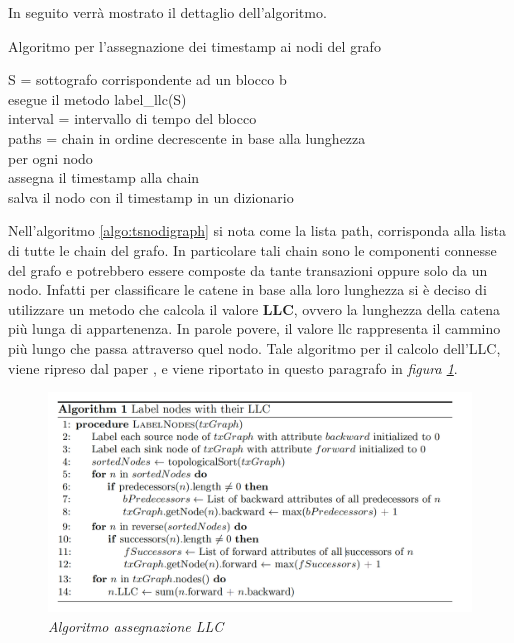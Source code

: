In seguito verrà mostrato il dettaglio dell'algoritmo.
\\
\begin{algorithm}[h]
	\caption{Algoritmo per l'assegnazione dei timestamp ai nodi del grafo} \label{algo:tsnodigraph}
	\begin{algorithmic}

		S = sottografo corrispondente ad un blocco b\\
		esegue il metodo label_llc(S)\\
		interval = intervallo di tempo del blocco	\\
		paths = chain in ordine decrescente in base alla lunghezza\\
			per ogni nodo\\
				assegna il timestamp alla chain\\
					salva il nodo con il timestamp in un dizionario
				\EndFor
			
			\EndIf
		\EndFor
	\EndFor
		
	\end{algorithmic}
\end{algorithm}

Nell'algoritmo \ref{algo:tsnodigraph} si nota come la lista path, corrisponda alla lista di tutte le chain del grafo. In particolare tali chain sono le componenti connesse del grafo e potrebbero essere composte da tante transazioni oppure solo da un nodo. Infatti per classificare le catene in base alla loro lunghezza si è deciso di utilizzare un metodo che calcola il valore \textbf{LLC}, ovvero la lunghezza della catena più lunga di appartenenza. In parole povere, il valore llc rappresenta il cammino più lungo che passa attraverso quel nodo.
Tale algoritmo per il calcolo dell'LLC, viene ripreso dal paper \cite{ddp-ltcbh-17}, e viene riportato in questo paragrafo in \textit{figura \ref{fig:llcalgo}}.
\\
\begin{figure}[htbp]
	\centering
	\includegraphics[width = \linewidth]{figure/llcalgo}
	\caption{\textit{Algoritmo assegnazione LLC} \cite{ddp-ltcbh-17} \label{fig:llcalgo}}
\end{figure}\\

